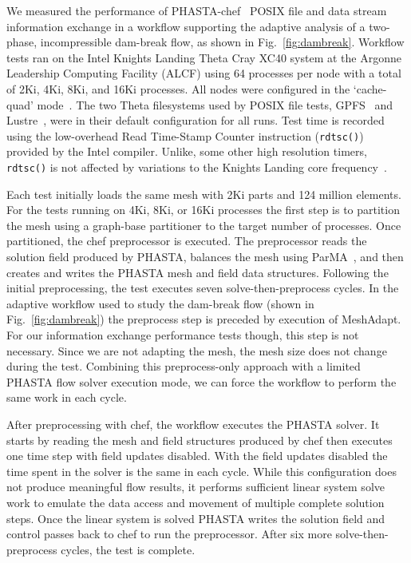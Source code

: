 
We measured the performance of PHASTA-chef~\cite{phastachef_github}
POSIX file and data stream information exchange in a workflow supporting
the adaptive analysis of a two-phase, incompressible dam-break flow, as shown in
Fig.~\ref{fig:dambreak}.
Workflow tests ran on the Intel Knights Landing Theta Cray XC40 system at
the Argonne Leadership Computing Facility (ALCF) using 64 processes per node
with a total of 2Ki, 4Ki, 8Ki, and 16Ki processes.
All nodes were configured in the `cache-quad' mode~\cite{knl,jeffers2016intel}.
The two Theta filesystems used by POSIX file tests,
GPFS~\cite{gpfs_2002} and Lustre~\cite{understanding_lustre_2009},
were in their default configuration for all runs.
Test time is recorded using the low-overhead Read Time-Stamp Counter instruction
(\texttt{rdtsc()}) provided by the Intel compiler.
Unlike, some other high resolution timers, \texttt{rdtsc()} is not affected by
variations to the Knights Landing core frequency~\cite{jeffers2016intel}.

Each test initially loads the same mesh with 2Ki parts and 124 million elements.
For the tests running on 4Ki, 8Ki, or 16Ki processes the first step is to
partition the mesh using a graph-base partitioner to the target number of
processes.
Once partitioned, the chef preprocessor is executed.
The preprocessor reads the solution field produced by PHASTA, balances the mesh
using ParMA~\cite{SmithParma2015}, and then creates and writes the PHASTA mesh
and field data structures.
Following the initial preprocessing, the test executes seven
solve-then-preprocess cycles.
In the adaptive workflow used to study the dam-break flow (shown in
Fig.~\ref{fig:dambreak}) the preprocess step is preceded by execution of
MeshAdapt.
For our information exchange performance tests though, this step is not
necessary.
Since we are not adapting the mesh, the mesh size does not change during the
test.
Combining this preprocess-only approach with a limited PHASTA flow
solver execution mode, we can force the workflow to perform the same work in
each cycle.

After preprocessing with chef, the workflow executes the PHASTA
solver.
It starts by reading the mesh and field structures produced by chef
then executes one time step with field updates disabled.
With the field updates disabled the time spent in the solver is the same
in each cycle.
While this configuration does not produce meaningful flow results, it performs
sufficient linear system solve work to emulate the data access and movement of
multiple complete solution steps.
Once the linear system is solved PHASTA writes the solution field and
control passes back to chef to run the preprocessor.
After six more solve-then-preprocess cycles, the test is complete.

